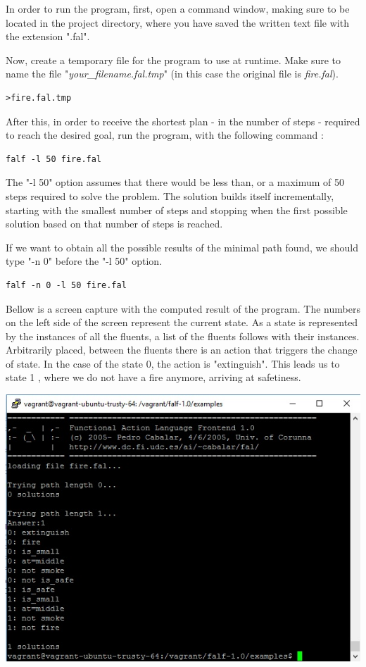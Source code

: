 \documentclass[a4paper,12pt]{report}
\begin{document}
	In order to run the program, first, open a command window, making sure to be located in the project directory, where you have saved the written text file with the extension ".fal".

Now, create a temporary file for the program to use at runtime.
Make sure to name the file "{\it your\_filename.fal.tmp}" (in this case the original file is {\it fire.fal}).
\begin{verbatim}
>fire.fal.tmp
\end{verbatim}


After this, in order to receive the shortest plan - in the number of steps - required to reach the desired goal, run the program, with the following command :
\begin{verbatim}
falf -l 50 fire.fal
\end{verbatim}

	The "-l 50" option assumes that there would be less than, or a maximum of 50 steps required to solve the problem. 
The solution builds itself incrementally, starting with the smallest number of steps and stopping when the first possible solution 
based on that number of steps is reached.

	If we want to obtain all the possible results of the minimal path found, we should type "-n 0" before the "-l 50" option.
\begin{verbatim}
falf -n 0 -l 50 fire.fal
\end{verbatim}


	Bellow is a screen capture with the computed result of the program.
 The numbers on the left side of the screen represent the current state.
 As a state is represented by the instances of all the fluents, a list of the fluents follows with their instances.
 Arbitrarily placed, between the fluents there is an action that triggers the change of state. 
 In the case of the state 0, the action is "extinguish". 
This leads us to state 1 , where we do not have a fire anymore, arriving at safetiness.


\vspace{0.5cm}
\includegraphics[scale=0.7]{capture_fire_small.jpg}
\end{document}
